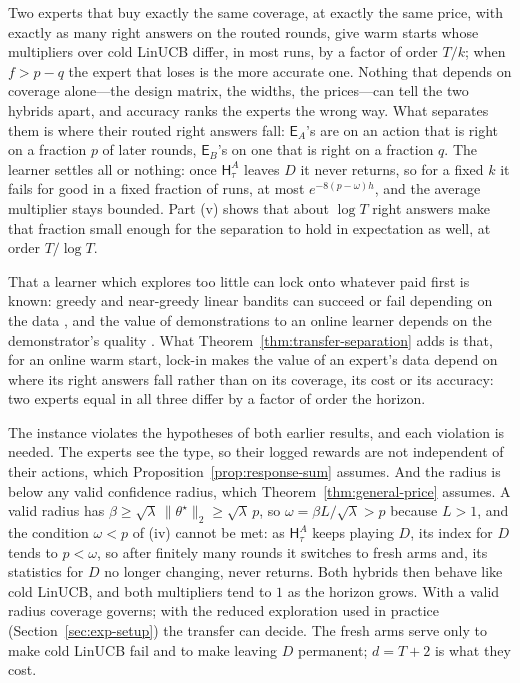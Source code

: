 \documentclass[anon]{alt2027} %
\newcommand{\Exp}{\mathsf{E}}
\newcommand{\Hyb}{\mathsf{H}}
\begin{document}
Two experts that buy exactly the same coverage, at exactly the same price,
with exactly as many right answers on the routed rounds, give warm starts
whose multipliers over cold LinUCB differ, in most runs, by a factor of order
$T/k$; when $f>p-q$ the expert that loses is the more accurate one. Nothing
that depends on coverage alone---the design matrix, the widths, the
prices---can tell the two hybrids apart, and accuracy ranks the experts the
wrong way. What separates them is where their routed right answers fall:
$\Exp_A$'s are on an action that is right on a fraction $p$ of later rounds,
$\Exp_B$'s on one that is right on a fraction $q$. The learner settles all or
nothing: once $\Hyb^A_\tau$ leaves $D$ it never returns, so for a fixed $k$ it
fails for good in a fixed fraction of runs, at most $e^{-8(p-\omega)h}$, and
the average multiplier stays bounded. Part (v) shows that about $\log T$ right
answers make that fraction small enough for the separation to hold in
expectation as well, at order $T/\log T$.

That a learner which explores too little can lock onto whatever paid first
is known: greedy and near-greedy linear bandits can succeed or fail
depending on the data \citep{bastani2021mostly}, and the value of
demonstrations to an online learner depends on the demonstrator's quality
\citep{hao2023leveraging}. What Theorem~\ref{thm:transfer-separation} adds is
that, for an online warm start, lock-in makes the value of an expert's data
depend on where its right answers fall rather than on its coverage, its cost
or its accuracy: two experts equal in all three differ by a factor of order
the horizon.

\begin{remark}
\label{rem:transfer-regime}
The instance violates the hypotheses of both earlier results, and each
violation is needed. The experts see the type, so their logged rewards are not
independent of their actions, which Proposition~\ref{prop:response-sum}
assumes. And the radius is below any valid confidence radius, which
Theorem~\ref{thm:general-price} assumes. A valid radius has
$\beta\ge\sqrt\lambda\,\|\theta^\star\|_2\ge\sqrt\lambda\,p$, so
$\omega=\beta L/\sqrt\lambda>p$ because $L>1$, and the condition $\omega<p$ of
(iv) cannot be met: as $\Hyb^A_\tau$ keeps playing $D$, its index for $D$
tends to $p<\omega$, so after finitely many rounds it switches to fresh arms
and, its statistics for $D$ no longer changing, never returns. Both hybrids
then behave like cold LinUCB, and both multipliers tend to $1$ as the horizon
grows. With a valid radius coverage governs; with the reduced exploration used
in practice (Section~\ref{sec:exp-setup}) the transfer can decide. The fresh
arms serve only to make cold LinUCB fail and to make leaving $D$ permanent;
$d=T+2$ is what they cost.
\end{remark}
\end{document}
